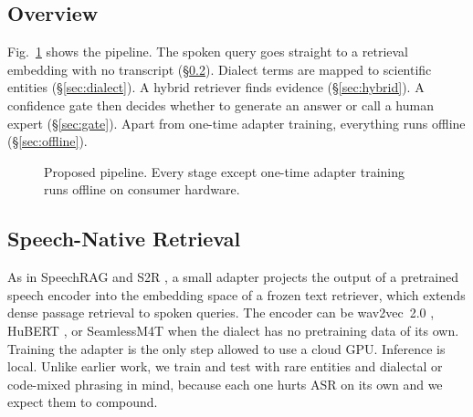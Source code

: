 \documentclass[conference]{IEEEtran}
\begin{document}
\subsection{Overview}
Fig.~\ref{fig:architecture} shows the pipeline. The spoken query goes straight to a retrieval embedding with no transcript (\S\ref{sec:speech}). Dialect terms are mapped to scientific entities (\S\ref{sec:dialect}). A hybrid retriever finds evidence (\S\ref{sec:hybrid}). A confidence gate then decides whether to generate an answer or call a human expert (\S\ref{sec:gate}). Apart from one-time adapter training, everything runs offline (\S\ref{sec:offline}).

\begin{figure}[t]
\centering
{}
\caption{Proposed pipeline. Every stage except one-time adapter training runs offline on consumer hardware.}
\label{fig:architecture}
\end{figure}

\subsection{Speech-Native Retrieval}\label{sec:speech}
As in SpeechRAG \cite{min2025speechrag} and S2R \cite{google2025s2r}, a small adapter projects the output of a pretrained speech encoder into the embedding space of a frozen text retriever, which extends dense passage retrieval \cite{karpukhin2020dpr} to spoken queries. The encoder can be wav2vec~2.0 \cite{baevski2020wav2vec}, HuBERT \cite{hsu2021hubert}, or SeamlessM4T \cite{barrault2023seamlessm4t} when the dialect has no pretraining data of its own. Training the adapter is the only step allowed to use a cloud GPU. Inference is local. Unlike earlier work, we train and test with rare entities and dialectal or code-mixed phrasing in mind, because each one hurts ASR on its own \cite{benchmarkingasr2026,dialectmatters2026} and we expect them to compound.
\end{document}
